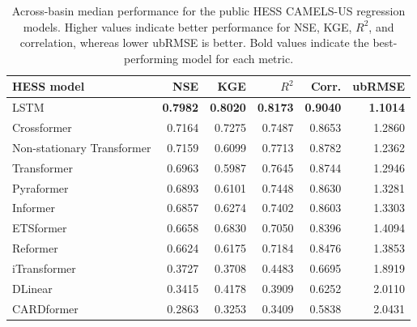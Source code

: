\begin{table}[!htbp]
\centering
\caption{Across-basin median performance for the public HESS CAMELS-US regression models. Higher values indicate better performance for NSE, KGE, $R^2$, and correlation, whereas lower ubRMSE is better. Bold values indicate the best-performing model for each metric.}
\label{tab:supp_hess_architecture_all}

\scriptsize
\renewcommand{\arraystretch}{1.08}

\begin{tabular}{lrrrrr}
\toprule
HESS model & NSE & KGE & $R^2$ & Corr. & ubRMSE \\
\midrule

LSTM &
\textbf{0.7982} &
\textbf{0.8020} &
\textbf{0.8173} &
\textbf{0.9040} &
\textbf{1.1014} \\

Crossformer &
0.7164 &
0.7275 &
0.7487 &
0.8653 &
1.2860 \\

Non-stationary Transformer &
0.7159 &
0.6099 &
0.7713 &
0.8782 &
1.2362 \\

Transformer &
0.6963 &
0.5987 &
0.7645 &
0.8744 &
1.2946 \\

Pyraformer &
0.6893 &
0.6101 &
0.7448 &
0.8630 &
1.3281 \\

Informer &
0.6857 &
0.6274 &
0.7402 &
0.8603 &
1.3303 \\

ETSformer &
0.6658 &
0.6830 &
0.7050 &
0.8396 &
1.4094 \\

Reformer &
0.6624 &
0.6175 &
0.7184 &
0.8476 &
1.3853 \\

iTransformer &
0.3727 &
0.3708 &
0.4483 &
0.6695 &
1.8919 \\

DLinear &
0.3415 &
0.4178 &
0.3909 &
0.6252 &
2.0110 \\

CARDformer &
0.2863 &
0.3253 &
0.3409 &
0.5838 &
2.0431 \\

\bottomrule
\end{tabular}

\end{table}

